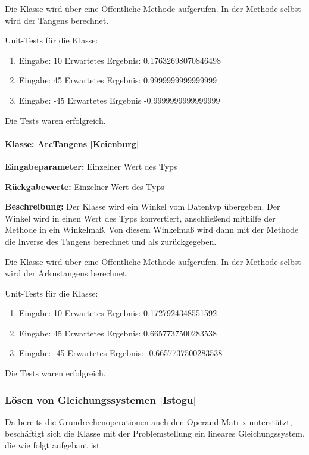 Die Klasse wird über eine Öffentliche Methode aufgerufen. In der Methode selbst wird der Tangens berechnet. 

Unit-Tests für die Klasse: 	
\begin{enumerate}
	\item Eingabe:  10 Erwartetes Ergebnis: 0.17632698070846498
	\item Eingabe:  45 Erwartetes Ergebnis: 0.9999999999999999
	\item Eingabe: -45 Erwartetes Ergebnis -0.9999999999999999
\end{enumerate}
Die Tests waren erfolgreich.

\paragraph{Klasse: ArcTangens [Keienburg]}
\textbf{Eingabeparameter: } Einzelner Wert des Typs 

\textbf{Rückgabewerte: } Einzelner Wert des Typs 

\textbf{Beschreibung: }Der Klasse wird ein Winkel vom Datentyp  übergeben. Der Winkel wird in einen Wert des Typs  konvertiert, anschließend mithilfe der Methode  in ein Winkelmaß. Von diesem Winkelmaß wird dann mit der Methode  die Inverse des Tangens berechnet und als  zurückgegeben. 
 
Die Klasse wird über eine Öffentliche Methode aufgerufen. In der Methode selbst wird der Arkustangens berechnet. 

Unit-Tests für die Klasse: 	
\begin{enumerate}
	\item Eingabe:  10 Erwartetes Ergebnis: 0.1727924348551592
	\item Eingabe:  45 Erwartetes Ergebnis: 0.6657737500283538
	\item Eingabe: -45 Erwartetes Ergebnis: -0.6657737500283538
\end{enumerate}
Die Tests waren erfolgreich.

\subsubsection{Lösen von Gleichungssystemen [Istogu]}

Da bereits die Grundrechenoperationen auch den Operand Matrix unterstützt, beschäftigt sich die Klasse  mit der Problemstellung ein lineares Gleichungssystem, die wie folgt aufgebaut ist.

